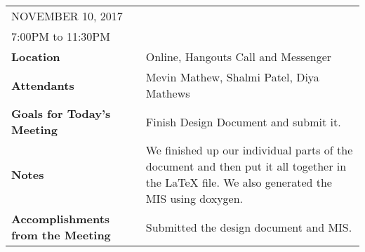 \documentclass{article}
\begin{document}
\begin{table}[hp]
\begin{tabularx}{\textwidth}{lX}
\toprule
NOVEMBER 10, 2017\\
7:00PM to 11:30PM\\
\midrule
\textbf{Location} & Online, Hangouts Call and Messenger\\
\textbf{Attendants} & Mevin Mathew, Shalmi Patel, Diya Mathews\\
\midrule
\textbf{Goals for Today's Meeting} & Finish Design Document and submit it.\\
\midrule
\textbf{Notes} & We finished up our individual parts of the document and then put it all together in the LaTeX file. We also generated the MIS using doxygen.\\
\midrule
\textbf{Accomplishments from the Meeting} & Submitted the design document and MIS.\\
\bottomrule
\end{tabularx}
\end{table}
\end{document}
